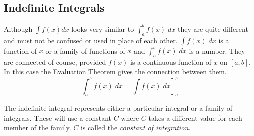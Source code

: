 \subsection*{Indefinite Integrals}
Although $\int f (x) d x$ looks very similar to $\int _{a}^{b}f (x)\; d x$ they are quite different and must not be confused or used in place of each other. $\int f (x)\; d x$ is a function of $x$ or a family of functions of $x$ and $\int _{a}^{b}f (x)\; d x$ is a number. They are connected of course, provided $f (x)$ is a continuous function of $x$ on $\left [a ,b\right ]$. In this case the Evaluation Theorem gives the connection between them.
\begin{equation*}\int _{a}^{b}f (x)\; d x =\left .\int f (x)\; d x\right ]_{a}^{b}
\end{equation*}

The indefinite integral represents either a particular integral or a family of integrals. These will use a constant $C$ where $C$ takes a different value for each member of the family. $C$ is called the \emph{constant of integration}. 

